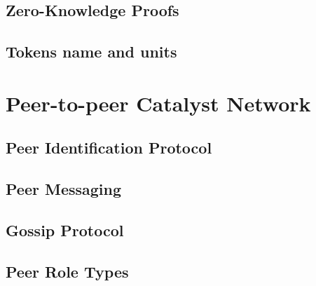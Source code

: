 \documentclass[a4paper, 12pt]{article}
\begin{document}


\subsection{Zero-Knowledge Proofs}\label{Sec:ZKP}



\subsection{Tokens name and units}\label{Sec:Tok}





 \newpage
 
\section{Peer-to-peer Catalyst Network} \label{Cha:NAPI}



\subsection{Peer Identification Protocol}\label{Sec:PIP}



\subsection{Peer Messaging}



\subsection{Gossip Protocol}



\subsection{Peer Role Types}\label{Sec:PRT}

\end{document}
